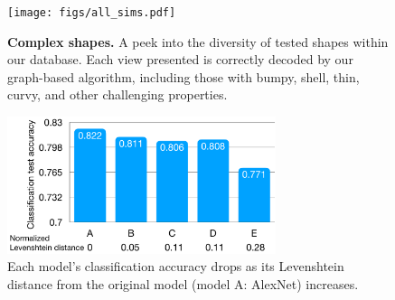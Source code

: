 \documentclass[12pt]{report}
\begin{document}
\begin{figure}[H]
    \centering
    \vspace{-16mm}
    \texttt{[image: figs/all\_sims.pdf]}
    \caption{
    \textbf{Complex shapes.}
    A peek into the diversity of tested shapes within our database. 
    Each view presented is correctly decoded by our graph-based algorithm, including those 
    with bumpy, shell, thin, curvy, and other challenging properties.}
    \label{fig:thingi10k}
\end{figure}

\begin{figure}[t]%
  \vspace{-4mm}
  \begin{center}
    \includegraphics[width=0.7\textwidth]{figs/edit_dist_perf.pdf}
  \end{center}
  \vspace{-6mm}
  \caption{Each model's classification accuracy drops as its Levenshtein 
  distance from the original model (model \textsf{A}: AlexNet) increases. \label{fig:edit_dist}}
  \vspace{-2mm}
\end{figure}


\begin{table}[h]
\centering
\caption{\textbf{DNN estimation accuracies.}  
Using the 1804 convolutional layers in our test dataset,
we measure the accuracies of our DNN models for estimating the
convolutional layers' hyperparameters. Here, we break the accuracies down 
into the accuracies for individual hyperparameters.
}\label{tab:dnn}
\end{table}
\end{document}
